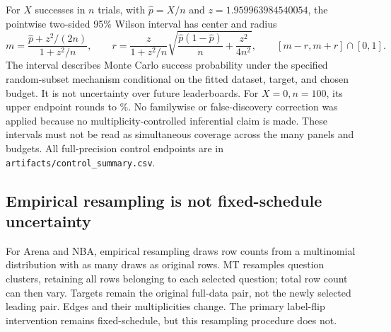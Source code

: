 For $X$ successes in $n$ trials, with $\hat p=X/n$ and $z=1.959963984540054$, the pointwise two-sided 95\% Wilson interval has center and radius
\begin{equation}
 m=\frac{\hat p+z^2/(2n)}{1+z^2/n},\qquad
 r=\frac{z}{1+z^2/n}\sqrt{\frac{\hat p(1-\hat p)}{n}+\frac{z^2}{4n^2}},
 \qquad [m-r,m+r]\cap[0,1].
\label{eq:wilson}
\end{equation}
The interval describes Monte Carlo success probability under the specified random-subset mechanism conditional on the fitted dataset, target, and chosen budget. It is not uncertainty over future leaderboards. For $X=0,n=100$, its upper endpoint rounds to \ZeroUpper\%. No familywise or false-discovery correction was applied because no multiplicity-controlled inferential claim is made. These intervals must not be read as simultaneous coverage across the many panels and budgets. All full-precision control endpoints are in \texttt{artifacts/control\_summary.csv}.

\subsection{Empirical resampling is not fixed-schedule uncertainty}
\begin{table}[htbp]
\centering
\caption{Selected-target descriptive resampling summaries. Gap bands are empirical 2.5th and 97.5th percentiles over 200 draws, not selection-adjusted population intervals. Positive margin means the original leader exceeds the original runner-up by more than $10^{-7}$. ``Slot witnesses'' counts successful auxiliary searches among the first 30 draws; these are attempted only for positive original-pair margins and edit resampled slots, possibly duplicated original IDs. Source: \texttt{artifacts/uncertainty.csv}; generated input: \texttt{paper/tables/bootstrap.tex}.}
\label{tab:bootstrap}
{\small}
\end{table}

For Arena and NBA, empirical resampling draws row counts from a multinomial distribution with as many draws as original rows. MT resamples question clusters, retaining all rows belonging to each selected question; total row count can then vary. Targets remain the original full-data pair, not the newly selected leading pair. Edges and their multiplicities change. The primary label-flip intervention remains fixed-schedule, but this resampling procedure does not.

